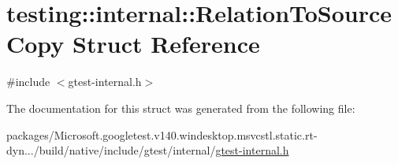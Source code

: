 \hypertarget{structtesting_1_1internal_1_1_relation_to_source_copy}{}\section{testing\+::internal\+::Relation\+To\+Source\+Copy Struct Reference}
\label{structtesting_1_1internal_1_1_relation_to_source_copy}


{\ttfamily \#include $<$gtest-\/internal.\+h$>$}



The documentation for this struct was generated from the following file\+:\begin{DoxyCompactItemize}
\item 
packages/\+Microsoft.\+googletest.\+v140.\+windesktop.\+msvcstl.\+static.\+rt-\/dyn.../build/native/include/gtest/internal/\mbox{\hyperlink{gtest-internal_8h}{gtest-\/internal.\+h}}\end{DoxyCompactItemize}
